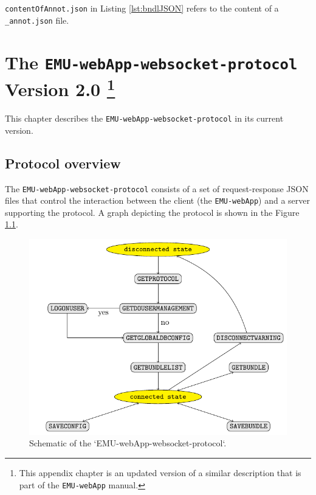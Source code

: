 \documentclass[]{book}
\let\rmarkdownfootnote\footnote%
\def\footnote{\protect\rmarkdownfootnote}
\theoremstyle{definition}
\theoremstyle{definition}
\theoremstyle{definition}
\theoremstyle{remark}
\begin{document}
\texttt{contentOfAnnot.json} in Listing \ref{lst:bndlJSON} refers to the
content of a \texttt{\_annot.json} file.

\hypertarget{app-chap:wsProtocol}{%
\chapter[The \texttt{EMU-webApp-websocket-protocol} Version 2.0
]{\texorpdfstring{The \texttt{EMU-webApp-websocket-protocol} Version 2.0
\footnote{This appendix chapter is an updated version of a similar
  description that is part of the \texttt{EMU-webApp} manual.}}{The EMU-webApp-websocket-protocol Version 2.0 }}\label{app-chap:wsProtocol}}

This chapter describes the \texttt{EMU-webApp-websocket-protocol} in its
current version.

\hypertarget{protocol-overview}{%
\section{Protocol overview}\label{protocol-overview}}

The \texttt{EMU-webApp-websocket-protocol} consists of a set of
request-response JSON files that control the interaction between the
client (the \texttt{EMU-webApp}) and a server supporting the protocol. A
graph depicting the protocol is shown in the Figure
\ref{fig:app-chapWsProtocolGraph}.

\begin{figure}

{\centering \includegraphics[width=0.75\linewidth]{pics/protocol} 

}

\caption{Schematic of the `EMU-webApp-websocket-protocol`.}\label{fig:app-chapWsProtocolGraph}
\end{figure}
\end{document}
